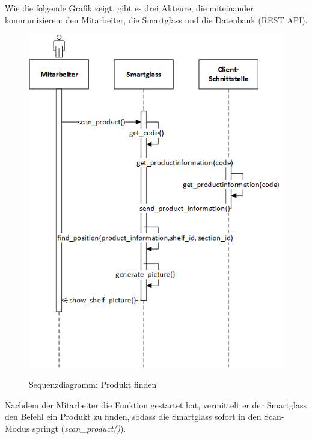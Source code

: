 Wie die folgende Grafik zeigt, gibt es drei Akteure, die miteinander kommunizieren: den Mitarbeiter, die Smartglass und die Datenbank (REST API).
\begin{figure}[H]
	\centering
	{\includegraphics[scale=0.8]{Bilder/Abbildungen/SMAR_produkt_finden_Sequenzdiagramm.png}}
	\caption{Sequenzdiagramm: Produkt finden}
	\label{fig:sequenz_finden}
\end{figure}
Nachdem der Mitarbeiter die Funktion gestartet hat, vermittelt er der Smartglass den Befehl ein Produkt zu finden, sodass die Smartglass sofort in den Scan-Modus springt (\emph{scan\_product()}). 

